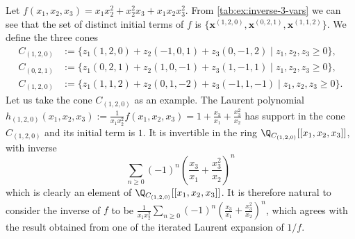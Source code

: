 \documentclass[11pt,e-only]{amsart}
\begin{document}
\begin{example} Let $f(x_1,x_2,x_3)=x_1x_2^2+x_2^2x_3+x_1x_2x_3^2$. From \cref{tab:ex:inverse-3-vars} we can see that the set of distinct initial terms of $f$ is $\{\mathbf{x}^{(1,2,0)},\mathbf{x}^{(0,2,1)},\mathbf{x}^{(1,1,2)}\}$. We define the three cones
\begin{equation}
\begin{split}
    C_{(1,2,0)}&:=\{z_1(1,2,0)+z_2(-1,0,1)+z_3(0,-1,2)\mid z_1,z_2,z_3\geq 0\}, \\
    C_{(0,2,1)}&:=\{z_1(0,2,1)+z_2(1,0,-1)+z_3(1,-1,1)\mid z_1,z_2,z_3\geq 0\}, \\
    C_{(1,2,0)}&:=\{z_1(1,1,2)+z_2(0,1,-2)+z_3(-1,1,-1)\mid z_1,z_2,z_3\geq 0\}.
\end{split} 
\end{equation}
Let us take the cone $C_{(1,2,0)}$ as an example. The Laurent polynomial $h_{(1,2,0)}(x_1,x_2,x_3):=\frac{1}{x_1x_2^2}f(x_1,x_2,x_3)=1+\frac{x_3}{x_1}+\frac{x_3^2}{x_2}$ has support in the cone $C_{(1,2,0)}$ and its initial term is $1$. It is invertible in the ring $\Q_{C_{(1,2,0)}}[[x_1,x_2,x_3]]$, with inverse
\begin{equation}
    \sum_{n\geq 0} (-1)^n\left(\frac{x_3}{x_1}+\frac{x_3^2}{x_2}\right)^n
\end{equation}
which is clearly an element of $\Q_{C_{(1,2,0)}}[[x_1,x_2,x_3]]$. It is therefore natural to consider the inverse of $f$ to be $\frac{1}{x_1x_2^2}\sum_{n\geq 0} (-1)^n\left(\frac{x_3}{x_1}+\frac{x_3^2}{x_2}\right)^n$, which agrees with the result obtained from one of the iterated Laurent expansion of $1/f$.
\end{example}


\end{document}
